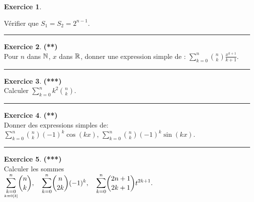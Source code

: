 \documentclass[a4paper,11pt]{article}
\theoremstyle{definition}
\newtheorem{exo}{Exercice} %
\begin{document}
\begin{minipage}[t]{1\linewidth}
\begin{minipage}[t]{0.48\linewidth}
\begin{exo}
\begin{enumerate}
				\noindent Vérifier que $S_1 = S_2 = 2^{n-1}$. 
			\end{enumerate}
			
			
			\centering
			\rule{1\linewidth}{0.6pt}
		\end{exo}
	
	\begin{exo}\textbf{(**)}\quad\\[0.2cm]
		
		Pour $n$ dans $\mathbb{N}$, $x$ dans $\mathbb{R}$, donner une expression simple
		de : $\displaystyle\sum\limits_{k=0}^{n}{ {n \choose k}\frac{x^{k+1}}{k+1}}$.
		
		
		\centering
		\rule{1\linewidth}{0.6pt}
	\end{exo}
	

		
		\begin{exo}\textbf{(***)}\quad\\[0.2cm]
			Calculer $\displaystyle\sum\limits_{k=0}^{n}{k^2 {n \choose k}}$.
			
			
			\centering
			\rule{1\linewidth}{0.6pt}
		\end{exo}
		
		
		
		
	\end{minipage}	
	\hfill\vrule\hfill
	\begin{minipage}[t]{0.48\linewidth}
	\raggedright
		
		
		
		\begin{exo}\textbf{(**)}\quad\\[0.2cm]
			Donner des expressions simples de:\\[0.2cm]
			
			\centering$\displaystyle\sum\limits_{k=0}^{n}{ {n \choose k}(-1)^k\cos(kx)}$, \quad$\displaystyle\sum\limits_{k=0}^{n}{ {n \choose k}(-1)^k\sin(kx)}$.
			
			
			\centering
			\rule{1\linewidth}{0.6pt}
		\end{exo}
		
		\begin{exo}\textbf{(***)}\quad\\[0.2cm]
			Calculer les sommes\\[0.4cm]
			
			\centering$\displaystyle\mathlarger\sum\limits_{\underset{k\equiv0[3]}{k=0}}^{n}{ {n \choose k}},\quad \mathlarger\sum\limits_{k=0}^{n}{ {n \choose 
					2k}(-1)^k},\quad \mathlarger\sum\limits_{k=0}^{n}{ {2n+1 \choose 2k+1}t^{2k+1}}.$
			

\end{exo}
\end{minipage}
\end{minipage}
\end{document}
